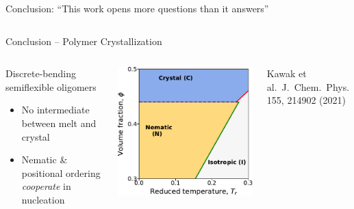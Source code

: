 \documentclass[aspectratio=169]{beamer}
\begin{document}
\begin{frame}[c]{Conclusion: ``This work opens more questions than it answers''}
\begin{columns}[T, onlytextwidth]
  \end{columns}

\end{frame}

\begin{frame}[c]{Conclusion -- Polymer Crystallization}

  \begin{columns}[T, onlytextwidth]


    \vspace{-0.6\baselineskip}

    \centering
    \begin{block}{Discrete-bending semiflexible oligomers}
      \begin{itemize}
      \item No intermediate between melt and crystal
      \item Nematic \& positional ordering \emph{cooperate} in nucleation
    \end{itemize}
    \end{block}

    \vspace{8pt}
    \includegraphics[scale=0.6]{../figures/fig-step_vs_harm_phase_diags/from_step/fig-phase_diag.pdf}

    {\scriptsize{}Kawak et al.~J.~Chem.~Phys. 155, 214902 (2021)\par}


\end{columns}
\end{frame}
\end{document}
